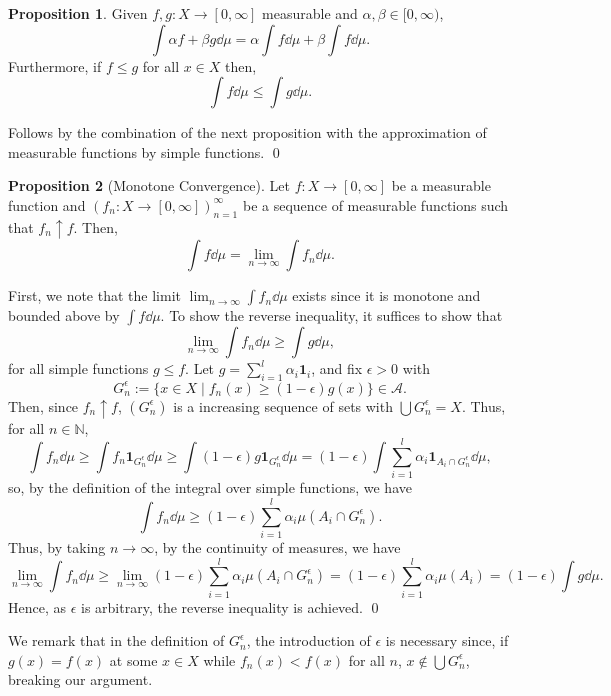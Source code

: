 \documentclass[
]{article}
\theoremstyle{definition}
\newtheorem{prop}{Proposition}
\theoremstyle{definition}
\begin{document}
\begin{prop}
  Given \(f, g : X \to [0, \infty]\) measurable and \(\alpha, \beta \in [0, \infty)\),
  \[\int \alpha f + \beta g \dd \mu = \alpha \int f \dd \mu + \beta \int f \dd \mu.\] 
  Furthermore, if \(f \le g\) for all \(x \in X\) then, 
  \[\int f \dd \mu \le \int g \dd \mu.\]
\end{prop}
\proof

Follows by the combination of the next proposition with the
approximation of measurable functions by simple functions. \qed

\begin{prop}[Monotone Convergence]
  Let \(f : X \to [0, \infty]\) be a measurable function and 
  \((f_n : X \to [0, \infty])_{n = 1}^\infty\) be a sequence of measurable functions 
  such that \(f_n \uparrow f\). Then,
  \[\int f \dd \mu = \lim_{n \to \infty} \int f_n \dd \mu.\]
\end{prop}
\proof

First, we note that the limit \(\lim_{n \to \infty} \int f_n \dd \mu\)
exists since it is monotone and bounded above by \(\int f \dd \mu\). To
show the reverse inequality, it suffices to show that
\[\lim_{n \to \infty} \int f_n \dd \mu \ge \int g \dd \mu,\] for all
simple functions \(g \le f\). Let
\(g = \sum_{i = 1}^l \alpha_i \mathbf{1}_i\), and fix \(\epsilon > 0\)
with
\[G_n^\epsilon := \{x \in X \mid f_n(x) \ge (1 - \epsilon) g(x)\} \in \mathcal{A}.\]
Then, since \(f_n \uparrow f\), \((G_n^\epsilon)\) is a increasing
sequence of sets with \(\bigcup G_n^\epsilon = X\). Thus, for all
\(n \in \mathbb{N}\),
\[\int f_n \dd \mu \ge \int f_n \mathbf{1}_{G_n^\epsilon} \dd \mu \ge 
    \int (1 - \epsilon) g\mathbf{1}_{G_n^\epsilon} \dd \mu 
    = (1 - \epsilon) \int \sum_{i = 1}^l \alpha_i \mathbf{1}_{A_i \cap G_n^\epsilon} \dd \mu,\]
so, by the definition of the integral over simple functions, we have
\[\int f_n \dd \mu \ge (1 - \epsilon) \sum_{i = 1}^l \alpha_i \mu(A_i \cap G_n^\epsilon).\]
Thus, by taking \(n \to \infty\), by the continuity of measures, we have
\[\lim_{n \to \infty} \int f_n \dd \mu \ge 
    \lim_{n \to \infty} (1 - \epsilon) \sum_{i = 1}^l \alpha_i \mu(A_i \cap G_n^\epsilon)
    = (1 - \epsilon) \sum_{i = 1}^l \alpha_i \mu(A_i) = (1 - \epsilon) \int g \dd \mu.\]
Hence, as \(\epsilon\) is arbitrary, the reverse inequality is achieved.
\qed

We remark that in the definition of \(G_n^\epsilon\), the introduction
of \(\epsilon\) is necessary since, if \(g(x) = f(x)\) at some
\(x \in X\) while \(f_n(x) < f(x)\) for all \(n\),
\(x \not\in \bigcup G_n^\epsilon\), breaking our argument.
\end{document}
